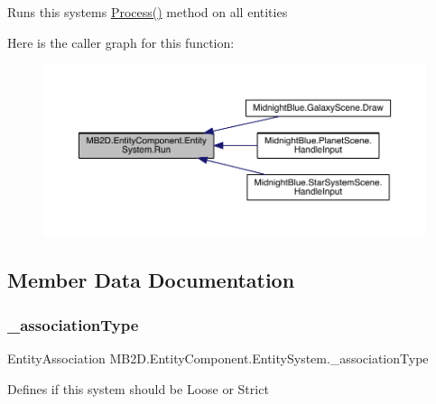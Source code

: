 Runs this systems \hyperlink{class_m_b2_d_1_1_entity_component_1_1_entity_system_abbf83b87cb5d12754fb058cef50451fa}{Process()} method on all entities 

Here is the caller graph for this function\+:
\nopagebreak
\begin{figure}[H]
\begin{center}
\leavevmode
\includegraphics[width=350pt]{class_m_b2_d_1_1_entity_component_1_1_entity_system_a3a1a74c4d3f8f0f452e0cdaa5515face_icgraph}
\end{center}
\end{figure}


\subsection{Member Data Documentation}
\hypertarget{class_m_b2_d_1_1_entity_component_1_1_entity_system_a1e5512e27d2cf3f40dcf8f39975ca1d7}{}\label{class_m_b2_d_1_1_entity_component_1_1_entity_system_a1e5512e27d2cf3f40dcf8f39975ca1d7} 
\subsubsection{\texorpdfstring{\+\_\+association\+Type}{\_associationType}}
{\footnotesize\ttfamily Entity\+Association M\+B2\+D.\+Entity\+Component.\+Entity\+System.\+\_\+association\+Type\hspace{0.3cm}{\ttfamily [protected]}}



Defines if this system should be Loose or Strict 

\hypertarget{class_m_b2_d_1_1_entity_component_1_1_entity_system_a7415c4bff1132bb4dadcc1a072c663da}{}\label{class_m_b2_d_1_1_entity_component_1_1_entity_system_a7415c4bff1132bb4dadcc1a072c663da} 
